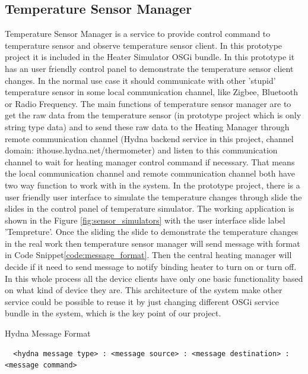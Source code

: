 \subsection{Temperature Sensor Manager}
\par Temperature Sensor Manager is a service to provide control command to temperature sensor and observe temperature sensor client. In this prototype project it is included in the Heater Simulator OSGi bundle.  In this prototype it has an user friendly control panel to demonstrate the temperature sensor client changes. In the normal use case it should communicate with other 'stupid' temperature sensor in some local communication channel, like Zigbee, Bluetooth or Radio Frequency. The main functions of temperature sensor manager are to get the raw data from the temperature sensor (in prototype project which is only string type data) and to send these raw data to the Heating Manager through remote communication channel (Hydna backend service in this project, channel domain: ithouse.hydna.net/thermometer) and listen to this communication channel to wait for heating manager control command if necessary. That means the local communication channel and remote communication channel both have two way function to work with in the system. In the prototype project, there is a user friendly user interface to simulate the temperature changes through slide the slides in the control panel of temperature simulator. The working application is shown in the Figure \ref{fig:sensor_simulators} with the user interface slide label 'Tempreture'. Once the sliding the slide to demonstrate the temperature changes in the real work then temperature sensor manager will send message with format in Code Snippet\ref{code:message_format}. Then the central heating manager will decide if it need to send message to notify binding heater to turn on or turn off. In this whole process all the device clients have only one basic functionality based on what kind of device they are. This architecture of the system make other service could be possible to reuse it by just changing different OSGi service bundle in the system, which is the key point of our project.

\begin{algorithm}[h]
  \caption{Hydna Message Format}
  \label{code:message_format}
  \begin{verbatim}
  <hydna message type> : <message source> : <message destination> : <message command>
 \end{verbatim}
\end{algorithm}

